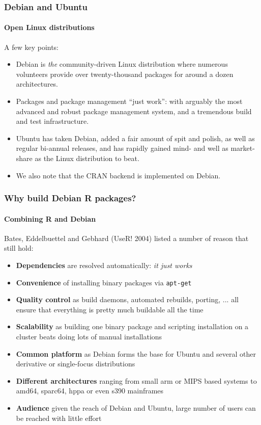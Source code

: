 \documentclass[smaller,compress]{beamer}
\begin{document}
\begin{frame}
  \frametitle{Debian and Ubuntu} %
  \framesubtitle{Open Linux distributions}

  A few key points:
  \begin{itemize} 
  \item Debian is \textsl{the} community-driven Linux distribution where
    numerous volunteers provide over twenty-thousand packages for around
    a dozen architectures.
  \item Packages and package management ``just work'': with arguably the most
    advanced and robust package management system, and a tremendous
    build and test infrastructure.
  \item Ubuntu has taken Debian, added a fair amount of spit and polish, as
    well as regular bi-annual releases, and has rapidly gained mind- and
    well as market-share as the Linux distribution to beat.
  \item We also note that the CRAN backend is implemented on Debian.
  \end{itemize}
\end{frame}

\begin{frame}
  \frametitle{Why build Debian R packages?}
  \framesubtitle{Combining R and Debian}
  Bates, Eddelbuettel and Gebhard (UseR! 2004) listed a number of reason
  that still hold:
  \begin{itemize} 
  \item \textbf{Dependencies} are resolved automatically: \textsl{it just
      works}
  \item \textbf{Convenience} of installing binary packages via
    \texttt{apt-get} %
  \item \textbf{Quality control} as build daemons, automated rebuilds,
    porting, ... all ensure that everything is pretty much buildable all the
    time
  \item \textbf{Scalability} as building one binary package and scripting
    installation on a cluster beats doing lots of manual installations
  \item \textbf{Common platform} as Debian forms the base for Ubuntu and
    several other derivative or single-focus distributions
  \item \textbf{Different architectures} ranging from small arm or MIPS based
    systems to amd64, sparc64, hppa or even s390 mainframes
  \item \textbf{Audience} given the reach of Debian and Ubuntu, large number
    of users can be reached with little effort
  \end{itemize}

\end{frame}
\end{document}
